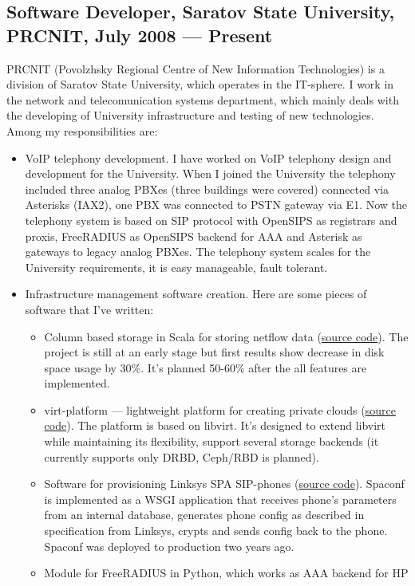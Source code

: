 \documentclass[a4paper,10pt]{article}
\begin{document}
\subsection{Software Developer, Saratov State University, PRCNIT, July 2008 ---
Present}
PRCNIT (Povolzhsky Regional Centre of New Information Technologies) is a division
of Saratov State University, which operates in the IT-sphere. I work in the
network and telecomunication systems department, which mainly deals with
the developing of University infrastructure and testing of new technologies. Among
my responsibilities are:
\begin{itemize}
\item VoIP telephony development. I have worked on VoIP telephony design and
development for the University. When I joined the University the telephony included
three analog PBXes (three buildings were covered) connected via Asterisks (IAX2),
one PBX was connected to PSTN gateway via E1. Now the telephony system is based on
SIP protocol with OpenSIPS as registrars and proxis, FreeRADIUS as OpenSIPS
backend for AAA and Asterisk as gateways to legacy analog PBXes. The telephony
system scales for the University requirements, it is easy manageable, fault tolerant.
\item Infrastructure management software creation. Here are some pieces of
software that I've written:
 \begin{itemize}
 \item Column based storage in Scala for storing netflow data
(\href{http://github.com/ivaxer/cbs}{source code}). The project is still at an
early stage but first results show decrease in disk space usage by 30\%. It's
planned 50-60\% after the all features are implemented.
 \item virt-platform --- lightweight platform for creating private clouds
(\href{http://git.sgu.ru/?p=virt-platform.git;a=summary}{source code}).
The platform is based on libvirt. It's designed to extend libvirt
while maintaining its flexibility, support several storage backends (it currently
supports only DRBD, Ceph\slash RBD is planned).
 \item Software for provisioning Linksys SPA SIP-phones
(\href{http://git.sgu.ru/?p=spaconf.git;a=summary}{source code}). Spaconf is
implemented as a WSGI application that receives phone's
parameters from an internal database, generates phone config as described in
specification from Linksys, crypts and sends config back to the phone.  Spaconf
was deployed to production two years ago.
 \item Module for FreeRADIUS in Python, which works as AAA backend for HP

\end{itemize}
\end{itemize}
\end{document}

